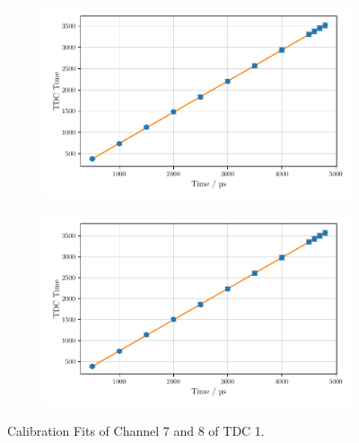 \begin{figure}
    \centering
    \begin{subfigure}[b]{0.48\textwidth}
        \includegraphics[width=\textwidth]{plots/tdc6.pdf}
    \end{subfigure}\hfill
    \begin{subfigure}[b]{0.48\textwidth}
        \includegraphics[width=\textwidth]{plots/tdc7.pdf}
    \end{subfigure}
    \caption{Calibration Fits of Channel 7 and 8 of TDC 1.}
    \label{fig:tdc67}
\end{figure}

